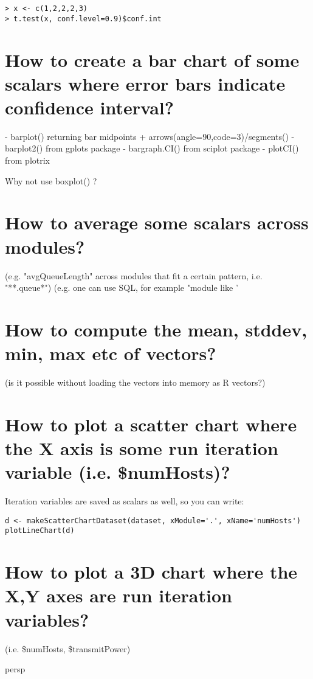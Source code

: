 \begin{verbatim}
> x <- c(1,2,2,2,3)
> t.test(x, conf.level=0.9)$conf.int
\end{verbatim}

\section{How to create a bar chart of some scalars where error bars indicate
confidence interval?}

- barplot() returning bar midpoints + arrows(angle=90,code=3)/segments()
- barplot2() from gplots package
- bargraph.CI() from sciplot package
- plotCI() from plotrix

Why not use boxplot() ?

\section{How to average some scalars across modules?}

 (e.g. "avgQueueLength"
across modules that fit a certain pattern, i.e. "**.queue*")
(e.g. one can use SQL, for example "module like '%

\section{How to compute the mean, stddev, min, max etc of vectors?}

(is it possible without loading the vectors into memory as R vectors?)

\section{How to plot a scatter chart where the X axis is some run iteration
variable (i.e. \$numHosts)?}

Iteration variables are saved as scalars as well, so you can write:

\begin{verbatim}
d <- makeScatterChartDataset(dataset, xModule='.', xName='numHosts')
plotLineChart(d)
\end{verbatim}

\section{How to plot a 3D chart where the X,Y axes are run iteration variables?}

(i.e. \$numHosts, \$transmitPower)

persp